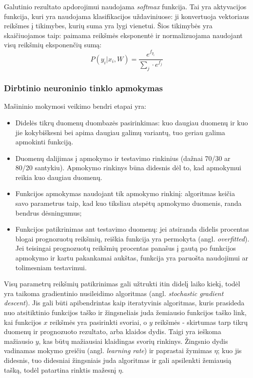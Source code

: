 
Galutinio rezultato apdorojimui naudojama \emph{softmax} funkcija. Tai yra aktyvacijos funkcija, kuri yra naudojama klasifikacijos uždaviniuose: ji konvertuoja vektoriaus reikšmes į tikimybes, kurių suma yra lygi vienetui. Šios tikimybės yra skaičiuojamos taip: paimama reikšmės eksponentė ir normalizuojama naudojant visų reikšmių eksponenčių sumą:
\begin{equation}
P(y_{i} | x_{i}, W) = \frac{e^{f_{y_i}}}{\sum _j\cdot e^{f_j}}
\end{equation}

\subsubsection{Dirbtinio neuroninio tinklo apmokymas}

Mašininio mokymosi veikimo bendri etapai yra:
\begin{itemize} 
\item Didelės tikrų duomenų duombazės pasirinkimas: kuo daugiau duomenų ir kuo jie kokybiškesni bei apima daugiau galimų variantų, tuo geriau galima apmokinti funkciją.\cite{stepniewska-dziubinska_development_2018}
\item Duomenų dalijimas į apmokymo ir testavimo rinkinius (dažnai 70/30 ar 80/20 santykiu). Apmokymo rinkinys būna didesnis dėl to, kad apmokymui reikia kuo daugiau duomenų.
\item Funkcijos apmokymas naudojant tik apmokymo rinkinį: algoritmas keičia savo parametrus taip, kad kuo tiksliau atspėtų apmokymo duomenis, randa bendrus dėsningumus;
\item Funkcijos patikrinimas ant testavimo duomenų: jei atsiranda didelis procentas blogai prognozuotų reikšmių, reiškia funkcija yra permokyta (angl. \textit{overfitted}). Jei teisingai prognozuotų reikšmių procentas panašus į gautą po funkcijos apmokymo ir kartu pakankamai aukštas, funkcija yra paruošta naudojimui ar tolimesniam testavimui.
\end{itemize}

Visų parametrų reikšmių patikrinimas gali užtrukti itin didelį laiko kiekį, todėl yra taikoma gradientinio nusileidimo algoritmas (angl. \textit{stochastic gradient descent}). Jis gali būti apibendrintas kaip iteratyvinis algoritmas, kuris prasideda nuo atsitiktinio funkcijos taško ir žingsneliais juda žemiausio funkcijos taško link, kai funkcijos $x$ reikšmės yra pasirinkti svoriai, o $y$ reikšmės - skirtumas tarp tikrų duomenų ir prognozuoto rezultato, arba klaidos dydis. Taigi yra ieškoma mažiausio $y$, kas būtų mažiausiai klaidingas svorių rinkinys. Žingsnio dydis vadinamas mokymo greičiu (angl. \textit{learning rate}) ir paprastai žymimas $\eta$; kuo jis didesnis, tuo didesniai žingsniais juda algoritmas ir gali apsilenkti žemiausią tašką, todėl patartina rinktis mažesnį $\eta$.

